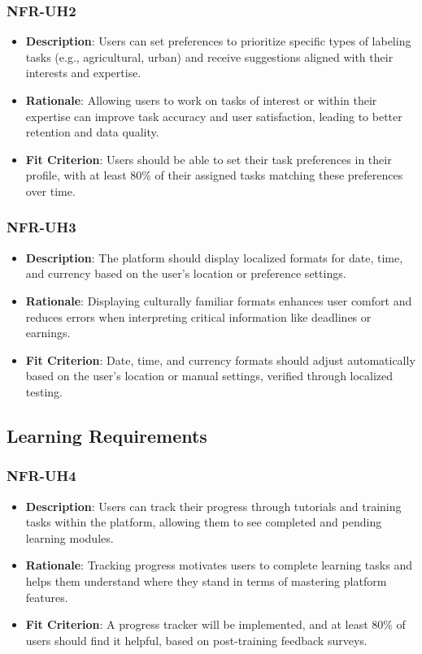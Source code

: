 \documentclass[12pt]{article}
\begin{document}
\subsubsection*{NFR-UH2} 
        \begin{itemize}
            \item \textbf{Description}: Users can set preferences to prioritize specific types of labeling tasks (e.g., agricultural, urban) and receive suggestions aligned with their interests and expertise.  
            \item \textbf{Rationale}: Allowing users to work on tasks of interest or within their expertise can improve task accuracy and user satisfaction, leading to better retention and data quality.  
            \item \textbf{Fit Criterion}: Users should be able to set their task preferences in their profile, with at least 80\% of their assigned tasks matching these preferences over time.
        \end{itemize}
        \subsubsection*{NFR-UH3} 
        \begin{itemize}
            \item \textbf{Description}: The platform should display localized formats for date, time, and currency based on the user's location or preference settings.  
            \item \textbf{Rationale}: Displaying culturally familiar formats enhances user comfort and reduces errors when interpreting critical information like deadlines or earnings.  
            \item \textbf{Fit Criterion}: Date, time, and currency formats should adjust automatically based on the user’s location or manual settings, verified through localized testing.
        \end{itemize}


\subsection{Learning Requirements}


\subsubsection*{NFR-UH4} 
        \begin{itemize} 
            \item \textbf{Description}: Users can track their progress through tutorials and training tasks within the platform, allowing them to see completed and pending learning modules.  
            \item \textbf{Rationale}: Tracking progress motivates users to complete learning tasks and helps them understand where they stand in terms of mastering platform features.  
            \item \textbf{Fit Criterion}: A progress tracker will be implemented, and at least 80\% of users should find it helpful, based on post-training feedback surveys.
        \end{itemize}
\end{document}
